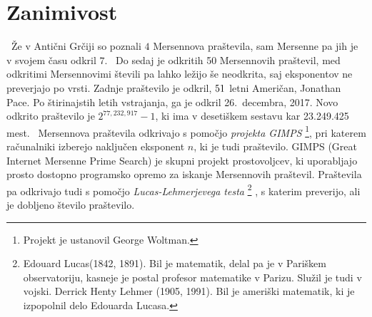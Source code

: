 \documentclass[12pt]{article}
\begin{document}
\section{Zanimivost}
\ Že v Antični Grčiji so poznali $4$ Mersennova praštevila, sam Mersenne pa jih je v svojem času odkril $7$.
\ Do sedaj je odkritih 50 Mersennovih praštevil, med odkritimi Mersennovimi števili pa lahko ležijo še neodkrita, saj eksponentov ne preverjajo po vrsti. Zadnje praštevilo je odkril, $51\-$ letni Američan, Jonathan Pace. Po štirinajstih letih vstrajanja, ga je odkril 26.~decembra, 2017. Novo odkrito praštevilo je $2^{77,232,917}-1$, ki ima v desetiškem sestavu kar 23.249.425 mest. 
\newline
\newline
\ Mersennova praštevila odkrivajo s pomočjo {\em projekta GIMPS} \footnote{Projekt je ustanovil George Woltman.}, pri katerem računalniki izberejo naključen eksponent $n$, ki je tudi praštevilo. GIMPS (Great Internet Mersenne Prime Search) je skupni projekt prostovoljcev, ki uporabljajo prosto dostopno programsko opremo za iskanje Mersennovih praštevil.  
\newline
\newline
Praštevila pa odkrivajo tudi s pomočjo {\em Lucas-Lehmerjevega testa} \footnote{Edouard Lucas(1842, 1891). Bil je matematik, delal pa je v Pariškem observatoriju, kasneje je postal profesor matematike v Parizu. Služil je tudi v vojski. Derrick Henty Lehmer (1905, 1991). Bil je ameriški matematik, ki je izpopolnil delo Edouarda Lucasa.} , s katerim preverijo, ali je dobljeno število praštevilo.
\end{document}
